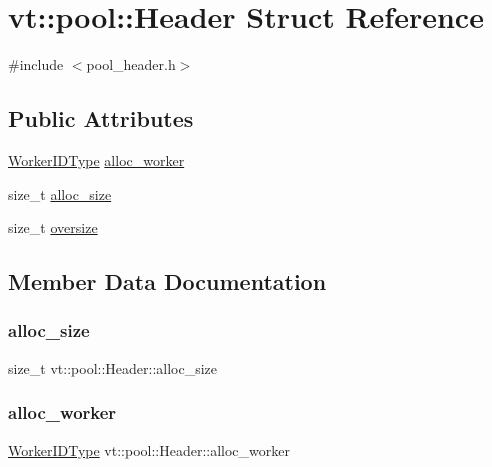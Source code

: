\hypertarget{structvt_1_1pool_1_1_header}{}\section{vt\+:\+:pool\+:\+:Header Struct Reference}
\label{structvt_1_1pool_1_1_header}


{\ttfamily \#include $<$pool\+\_\+header.\+h$>$}

\subsection*{Public Attributes}
\begin{DoxyCompactItemize}
\item 
\hyperlink{namespacevt_a656e362091da17b9b93d0655b36e3392}{Worker\+I\+D\+Type} \hyperlink{structvt_1_1pool_1_1_header_a054f2ad817d27c9725677c10ee487875}{alloc\+\_\+worker}
\item 
size\+\_\+t \hyperlink{structvt_1_1pool_1_1_header_ad1f8e915eee733cd6b4d8efbfe51d551}{alloc\+\_\+size}
\item 
size\+\_\+t \hyperlink{structvt_1_1pool_1_1_header_ac3271e96a2c67c907795aa172b3f70cb}{oversize}
\end{DoxyCompactItemize}


\subsection{Member Data Documentation}
\mbox{\label{structvt_1_1pool_1_1_header_ad1f8e915eee733cd6b4d8efbfe51d551}} 
\subsubsection{\texorpdfstring{alloc\+\_\+size}{alloc\_size}}
{\footnotesize\ttfamily size\+\_\+t vt\+::pool\+::\+Header\+::alloc\+\_\+size}

\mbox{\label{structvt_1_1pool_1_1_header_a054f2ad817d27c9725677c10ee487875}} 
\subsubsection{\texorpdfstring{alloc\+\_\+worker}{alloc\_worker}}
{\footnotesize\ttfamily \hyperlink{namespacevt_a656e362091da17b9b93d0655b36e3392}{Worker\+I\+D\+Type} vt\+::pool\+::\+Header\+::alloc\+\_\+worker}

